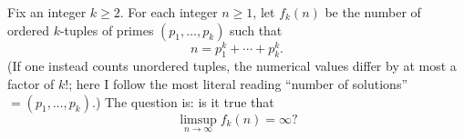 Fix an integer $k\ge 2$. For each integer $n\ge 1$, let $f_k(n)$ be the number of ordered $k$-tuples
of primes $(p_1,\dots,p_k)$ such that
\[
n=p_1^k+\cdots+p_k^k.
\]
(If one instead counts unordered tuples, the numerical values differ by at most a factor of $k!$; here I follow the most literal reading ``number of solutions'' $=(p_1,\dots,p_k)$.)
The question is: is it true that
\[
\limsup_{n\to\infty} f_k(n)=\infty?
\]
